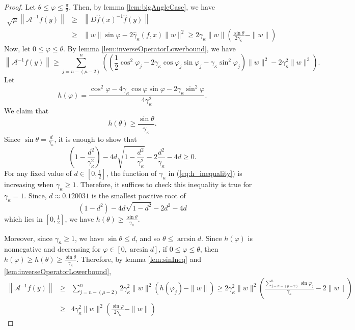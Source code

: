 \documentclass[12pt,oneside,reqno]{amsart}
\theoremstyle{definition}
\begin{document}
		\begin{proof}
			Let $\theta\leq \varphi\leq \frac{\pi}{2}$. Then, by lemma \ref{lem:bigAngleCase}, we have
			{\footnotesize
				\begin{eqnarray*}
					\sqrt{\mu}\left\|\mathcal{A}^{-1}f(y)\right\| & \geq &   \left\|D\hat{f}(x)^{-1}\hat{f}(y)\right\|\\
					&\geq & \|w\|\sin\varphi -2\hat{\gamma}_\kappa(f,x)\|w\|^2 \geq 2\gamma_\kappa\|w\|\left(\frac{\sin\theta}{2\gamma_\kappa}-\|w\|\right)
				\end{eqnarray*}}
				Now, let $0\leq \varphi \leq \theta$. By lemma \ref{lem:inverseOperatorLowerbound}, we have
				{\footnotesize
					\[\left\|\mathcal{A}^{-1}f(y)\right\|\geq \sum\limits_{j=n-(\mu-2)}^n\left(\left(\frac{1}{2}\cos^2\varphi_{j}-2\gamma_{\kappa}\cos\varphi_j\sin\varphi_j-\gamma_{\kappa}\sin^2\varphi_j\right)\|w\|^2 -2\gamma_{\kappa}^2\|w\|^3\right).\]}
				Let 
				{\footnotesize
					\[h(\varphi) = \frac{\cos^2 \varphi - 4\gamma_\kappa \cos\varphi \sin\varphi - 2\gamma_\kappa\sin^2\varphi}{4\gamma_\kappa^2}.\]}
				We claim that 
				\[h(\theta)\geq \frac{\sin\theta}{\gamma_\kappa}.\]
				Since $\sin\theta=\frac{d}{\gamma_\kappa}$, it is enough to show that
				{\footnotesize
					\begin{equation}\label{eq:h_inequality}
					\left(1-\frac{d^2}{\gamma_\kappa^2}\right)-4d\sqrt{1-\frac{d^2}{\gamma_\kappa^2}}-2\frac{d^2}{\gamma_\kappa}-4d\geq 0.
					\end{equation}}
				For any fixed value of $d\in \left[0,\frac{1}{2}\right]$, the function of $\gamma_\kappa$ in (\ref{eq:h_inequality}) is increasing when $\gamma_\kappa\geq 1$. Therefore, it suffices to check this inequality is true for $\gamma_\kappa=1$. Since, $d\approx 0.120031$ is the smallest positive root of
				\[(1-d^2)-4d\sqrt{1-d^2}-2d^2-4d\]
				which lies in $\left[0,\frac{1}{2}\right]$, we have $h(\theta)\geq\frac{\sin\theta}{\gamma_\kappa}$.
				
				Moreover, since $\gamma_\kappa\geq 1$, we have $\sin \theta \leq d$, and so $\theta \leq \arcsin d$. Since $h(\varphi)$ is nonnegative and decreasing for $\varphi\in \left[0,\arcsin d\right]$, if $0\leq \varphi \leq \theta$, then $h(\varphi)\geq h(\theta)\geq\frac{\sin \theta}{\gamma_\kappa}$. Therefore, by lemma \ref{lem:sinIneq} and \ref{lem:inverseOperatorLowerbound},
				{\footnotesize \begin{eqnarray*}
						\left\|\mathcal{A}^{-1}f(y)\right \|&\geq& \sum\limits_{j=n-(\mu-2)}^n 2\gamma_\kappa^2\|w\|^2\left(h(\varphi_{j})-\|w\|\right)\geq 2\gamma_\kappa^2\|w\|^2\left(\frac{\sum\limits_{j=n-(\mu-2)}^n\sin\varphi_j}{\gamma_\kappa}-2\|w\|\right)\\
						& \geq & 4\gamma_\kappa^2\|w\|^2\left(\frac{\sin\varphi}{2\gamma_\kappa}-\|w\|\right)
					\end{eqnarray*}}
				\end{proof}
\end{document}
